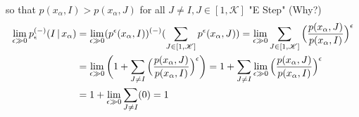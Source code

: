 \begin{frame} [t]
\begin{itemize}
            so that 
            $ p(x_{\alpha}, I) 
             > p(x_{\alpha}, J)
            $ for all 
            $ J \neq I, J\in [1,\mathscr{K}]$ 
            "E Step" (Why?)
            { \footnotesize
            \begin{align*}
              \lim _{\epsilon \gg 0}
              p ^{(-)}
                _{\epsilon} 
                ( I \,\vert\, x _{\alpha} )
            & = 
               \lim _{\epsilon \gg 0}
               ( p 
                   ^{\epsilon}
                   (x_{\alpha}, I)
               ) ^{(-)}
               ( \sum _{J\in[1,\mathscr{K}]}
                  p ^{\epsilon} 
                  (x _{\alpha}, J) 
               ) 
            = 
               \lim _{\epsilon \gg 0}
               \sum _{J\in [1, \mathscr{K}] }
               \Big(
               \frac 
               { p  (x_{\alpha}, J) 
               } 
               { p (x_{\alpha}, I)
               }
               \Big) ^{\epsilon}
            \\ & = 
               \lim _{\epsilon \gg 0} 
               \bigg(
                     1 + 
                     \sum _{J\neq I}
                       \Big(
                       \frac 
                       { p  (x_{\alpha}, J) 
                       } 
                       { p (x_{\alpha}, I)
                       }
                       \Big) ^{\epsilon}
               \bigg) 
            = 
               1 +
                 \sum _{J\neq I}
                   \lim _{\epsilon \gg 0} 
                   \Big(
                   \frac 
                   { p  (x_{\alpha}, J) 
                   } 
                   { p (x_{\alpha}, I)
                   }
                   \Big) ^{\epsilon}
            \\ & =
               1 +
               \lim _{\epsilon \gg 0} 
                     \sum _{J\neq I}
                       (0)
            = 1 
            \end{align*}
            } 
    \end{itemize}
\end{frame} 


